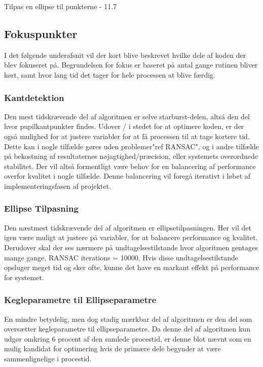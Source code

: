 \documentclass[rapport.tex]{subfiles}
\begin{document}
	Tilpas en ellipse til punkterne - 11.7%
	
	\subsection{Fokuspunkter}
	I det følgende underafsnit vil der kort blive beskrevet hvilke dele af koden der blev fokuseret på. Begrundelsen for fokus er baseret på antal gange rutinen bliver kørt, samt hvor lang tid det tager for hele processen at blive færdig.
	
	\subsubsection{Kantdetektion}
	Den mest tidskrævende del af algoritmen er selve starburst-delen, altså den del hvor pupilkantpunkter findes. Udover / i stedet for at optimere koden, er der også mulighed for at justere variabler for at få processen til at tage kortere tid. Dette kan i nogle tilfælde gøres uden problemer"ref RANSAC", og i andre tilfælde på bekostning af resultaternes nøjagtighed/præcision, eller systemets overordnede stabilitet. Der vil altså formentligt være behov for en balancering af performance overfor kvalitet i nogle tilfælde. Denne balancering vil foregå iterativt i løbet af implementeringsfasen af projektet.
	
	\subsubsection{Ellipse Tilpasning}
	Den næstmest tidskrævende del af algoritmen er ellipsetilpasningen. Her vil det igen være muligt at justere på variabler, for at balancere performance og kvalitet. Derudover skal der ses nærmere på undtagelsestilstande hvor algoritmen gentages mange gange, RANSAC iterations = 10000. Hvis disse undtagelsestilstande opsluger meget tid og sker ofte, kunne det have en markant effekt på performance for systemet.
	
	\subsubsection{Kegleparametre til Ellipseparametre}
	En mindre betydelig, men dog stadig mærkbar del af algoritmen er den del som oversætter kegleparametre til ellipseparametre. Da denne del af algoritmen kun udgør omkring 6 procent af den samlede procestid, er denne blot nævnt som en mulig kandidat for optimering hvis de primære dele begynder at være sammenlignelige i procestid. 
	
\end{document}
